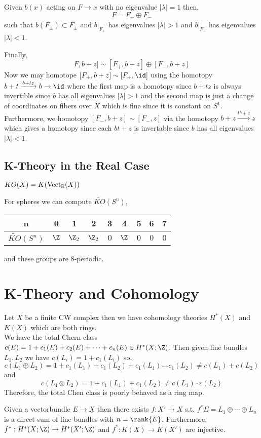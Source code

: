 \documentclass[12pt]{extarticle}
\begin{document}
\begin{lemma}
Given $b(x)$ acting on $F \to x$ with no eigenvalue $|\lambda| = 1$ then,
\[ F = F_{+} \oplus F_{-} \]
such that $b(F_{\pm}) \subset F_{\pm}$ and $b|_{F_{+}}$ has eigenvalues $|\lambda| > 1$ and $b|_{F_{-}}$ has eigenvalues $|\lambda| < 1$. 
\end{lemma}
\noindent
Finally, 
\[ F, b + z] \sim [F_+, b + z] \oplus [F_{-}, b + z] \]
Now we may homotope $[F_+, b + z] \sim [F_+, \id]$ using the homotopy $b + t \xrightarrow{b + t z} b \xrightarrow{} \id$ where the first map is a homotopy since $b + t z$ is always invertible since $b$ has all eigenvalues $|\lambda| > 1$ and the second map is just a change of coordinates on fibers over $X$ which is fine since it is constant on $S^1$. Furthermore, we homotopy $[F_{-}, b + z] \sim [F_{-}, z]$ via the homotopy $b+z \xrightarrow{t b + z} z$ which gives a homotopy since each $b t + z$ is invertable since $b$ has all eigenvalues $|\lambda| < 1$.

\subsection{K-Theory in the Real Case}

\begin{defn}
$KO(X) = K(\mathrm{Vect}_{\mathbb{R}}(X))$
\end{defn}

\begin{example}
For spheres we can compute $\widetilde{KO}(S^n)$,
\begin{center}
\begin{tabular}{ c | c | c | c | c | c | c | c | c }
n & 0 & 1 & 2 & 3 & 4 & 5 & 6 & 7 \\
\hline \hline
$\widetilde{KO}(S^n)$ & $\Z$  & $\Z_2$ & $\Z_2$ & $0$ & $\Z$ & $0$ & $0$ & $0$
\end{tabular}
\end{center}
and these groups are $8$-periodic.
\end{example}

\section{K-Theory and Cohomology}

Let $X$ be a finite CW complex then we have cohomology theories $H^*(X)$ and $K(X)$ which are both rings. 
\bigskip\\
We have the total Chern class $c(E) = 1 + c_1(E) + c_2(E) + \cdots + c_n(E) \in H^*(X; \Z)$. 
Then given line bundles $L_1, L_2$ we have $c(L_i) = 1 + c_1(L_i)$ so,
\[ c(L_1 \oplus L_2) = 1 + c_1(L_1) + c_1(L_2)+ c_1(L_1) \smile c_1(L_2) \neq c(L_1) + c(L_2) \]
and
\[ c(L_1 \otimes L_2) = 1 + c_1(L_1) + c_1(L_2) \neq c(L_1) \cdot c(L_2) \]
Therefore, the total Chen class is poorly behaved as a ring map. 
\bigskip\\
\begin{theorem}[Splitting]
Given a vectorbundle $E \to X$ then there exists $f : X' \to X$ s.t. $f^* E = L_1 \oplus \cdots \oplus L_n$ is a direct sum of line bundles with $n = \rank{E}$. Furthermore, $f^* : H^*(X; \Z) \to H^*(X'; \Z)$ and $f^* : K(X) \to K(X')$ are injective. 
\end{theorem}
\end{document}
